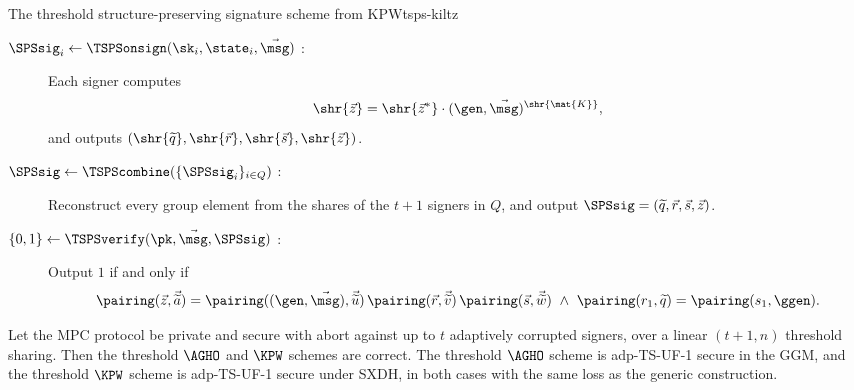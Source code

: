 \begin{protocolbox}{The threshold structure-preserving signature scheme from KPW}{tsps-kiltz}
\begin{description}
    \item[$\SPSsig_i \leftarrow \TSPSonsign(\sk_i, \state_i, \vec{\msg})$ :]
Each signer computes
      \begin{equation*}
	\shr{\vec{z}} = \shr{\vec{z}^*} \cdot (\gen, \vec{\msg})^{\shr{\mat{K}}},
      \end{equation*}
      and outputs
$(\shr{\widetilde{q}}, \shr{\vec{r}}, \shr{\vec{s}}, \shr{\vec{z}})$.

    \item[$\SPSsig \leftarrow \TSPScombine(\{\SPSsig_i\}_{i \in Q})$ :]
Reconstruct every group element from the shares of the $t+1$ signers in $Q$, and
output $\SPSsig = (\widetilde{q}, \vec{r}, \vec{s}, \vec{z})$.

    \item[$\{0,1\} \leftarrow \TSPSverify(\pk, \vec{\msg}, \SPSsig)$ :] Output
$1$ if and only if
      \begin{equation*}
	\pairing(\vec{z}, \vec{\widetilde{a}}) = \pairing((\gen,
\vec{\msg}), \vec{\widetilde{u}})\, \pairing(\vec{r},\vec{\widetilde{v}})\,
\pairing(\vec{s}, \vec{\widetilde{w}}) \ \wedge \ \pairing(r_1, \widetilde{q})
= \pairing(s_1, \ggen).
      \end{equation*}

  \end{description}

\end{protocolbox}

\begin{theorem}\label{thm:tsps-security} Let the MPC protocol be private and
secure with abort against up to $t$ adaptively corrupted signers, over a linear
$(t+1, n)$ threshold sharing. Then
the threshold $\AGHO$ and $\KPW$ schemes are correct. The threshold $\AGHO$
scheme is adp-TS-UF-1 secure in the GGM, and the threshold $\KPW$ scheme is
adp-TS-UF-1 secure under SXDH, in both
cases with the same loss as the generic construction.  \end{theorem}
